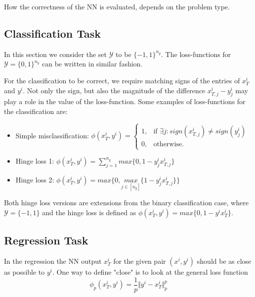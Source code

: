 \documentclass[a4paper, 12pt]{scrreprt} %
\begin{document}
How the correctness of the \ac{NN} is evaluated, depends on the problem type.

\subsection{Classification Task}
\label{subsec:clatas}
In this section we consider the set $\mathcal{Y}$ to be $\{-1,1\}^{n_y}$. The loss-functions for $\mathcal{Y} = \{0,1\}^{n_y}$ can be written in similar fashion.


For the classification to be correct, we require matching signs of the entries of $x^i_T$ and $y^i$. Not only the sign, but also the magnitude of the difference $x^i_{T,j}-y^i_j$ may play a role in the value of the loss-function. Some examples of loss-functions for the classification are:

\begin{itemize}
	\item Simple misclassification: $\phi(x^i_T,y^i) = \begin{cases} 1, & \text{if } \exists j : sign(x^i_{T,j}) \neq sign(y^i_j) \\
0, & \text{otherwise.}
\end{cases}$
	\item Hinge loss 1: $\phi(x^i_T,y^i) = \sum_{j=1}^{n_y}{max\{0,1-y^i_j x^i_{T,j}\}}$
	\item Hinge loss 2: $\phi(x^i_T,y^i) = max\{0,\underset{j \in [n_y]}{max}\{1-y^i_j x^i_{T,j}\}\}$
\end{itemize}

Both hinge loss versions are extensions from the binary classification case, where $\mathcal{Y} = \{-1,1\}$ and the hinge loss is defined as $\phi(x^i_T,y^i) = max\{0,1-y^i x^i_{T}\}$.


\subsection{Regression Task}
In the regression the \ac{NN} output $x^i_{T}$ for the given pair $(x^i,y^i)$ should be as close as possible to $y^i$. One way to define "close" is to look at the general loss function 
\begin{equation*}
\phi_p(x^i_T,y^i)=\frac{1}{p}\Vert y^i - x^i_T \Vert_p^p
\end{equation*}
\end{document}
